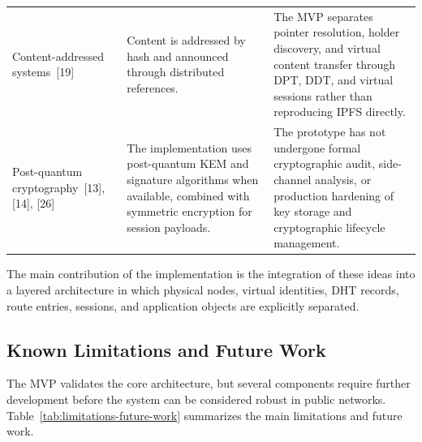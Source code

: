 \documentclass[12pt]{article}
\begin{document}
\begin{longtable}{L{0.20\textwidth} L{0.34\textwidth} L{0.34\textwidth}}
Content-addressed systems~[19] &
Content is addressed by hash and announced through distributed references. &
The MVP separates pointer resolution, holder discovery, and virtual content transfer through DPT, DDT, and virtual sessions rather than reproducing IPFS directly. \\

Post-quantum cryptography~[13], [14], [26] &
The implementation uses post-quantum KEM and signature algorithms when available, combined with symmetric encryption for session payloads. &
The prototype has not undergone formal cryptographic audit, side-channel analysis, or production hardening of key storage and cryptographic lifecycle management. \\
\end{longtable}
\endgroup

The main contribution of the implementation is the integration of these ideas into a layered architecture in which physical nodes, virtual identities, DHT records, route entries, sessions, and application objects are explicitly separated.

\subsection{Known Limitations and Future Work}
\label{sec:implementation-limitations-future-work}

The MVP validates the core architecture, but several components require further development before the system can be considered robust in public networks. Table~\ref{tab:limitations-future-work} summarizes the main limitations and future work.
\end{document}
